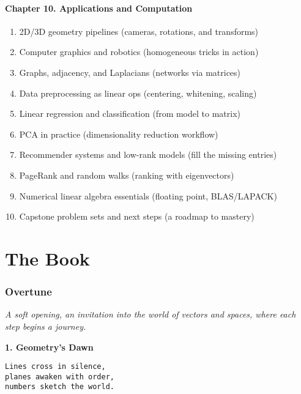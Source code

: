 \documentclass[
  letterpaper,
  DIV=11,
  numbers=noendperiod]{scrreprt}
\providecommand{\tightlist}{%
  \setlength{\itemsep}{0pt}\setlength{\parskip}{0pt}}
\begin{document}
\subsubsection{Chapter 10. Applications and
Computation}\label{chapter-10.-applications-and-computation}

\begin{enumerate}
\def\labelenumi{\arabic{enumi}.}
\setcounter{enumi}{90}
\tightlist
\item
  2D/3D geometry pipelines (cameras, rotations, and transforms)
\item
  Computer graphics and robotics (homogeneous tricks in action)
\item
  Graphs, adjacency, and Laplacians (networks via matrices)
\item
  Data preprocessing as linear ops (centering, whitening, scaling)
\item
  Linear regression and classification (from model to matrix)
\item
  PCA in practice (dimensionality reduction workflow)
\item
  Recommender systems and low-rank models (fill the missing entries)
\item
  PageRank and random walks (ranking with eigenvectors)
\item
  Numerical linear algebra essentials (floating point, BLAS/LAPACK)
\item
  Capstone problem sets and next steps (a roadmap to mastery)
\end{enumerate}


\chapter{The Book}\label{the-book}

\subsection{Overtune}\label{overtune}

\emph{A soft opening, an invitation into the world of vectors and
spaces, where each step begins a journey.}

\textbf{1. Geometry's Dawn}

\begin{verbatim}
Lines cross in silence,
planes awaken with order,
numbers sketch the world.
\end{verbatim}
\end{document}
